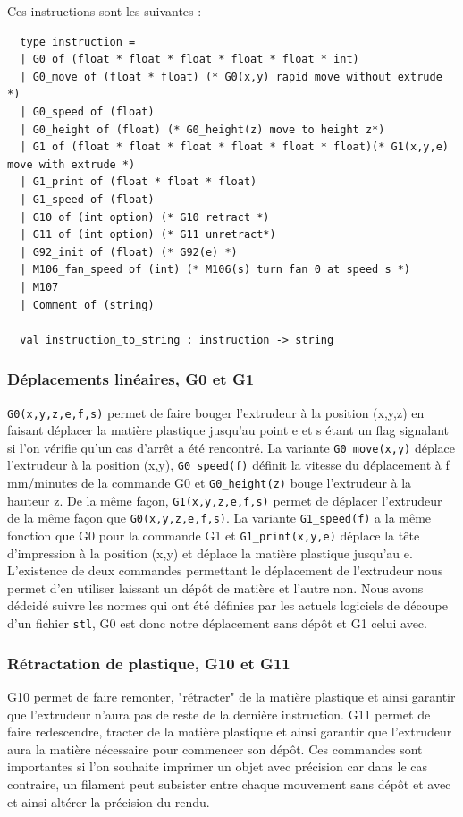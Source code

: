 \documentclass[11pt, titlepage]{article}
\begin{document}
Ces instructions sont les suivantes :
\begin{lstlisting}
  type instruction =
  | G0 of (float * float * float * float * float * int)
  | G0_move of (float * float) (* G0(x,y) rapid move without extrude *)
  | G0_speed of (float)
  | G0_height of (float) (* G0_height(z) move to height z*)
  | G1 of (float * float * float * float * float * float)(* G1(x,y,e) move with extrude *)
  | G1_print of (float * float * float)
  | G1_speed of (float)
  | G10 of (int option) (* G10 retract *)
  | G11 of (int option) (* G11 unretract*)
  | G92_init of (float) (* G92(e) *)
  | M106_fan_speed of (int) (* M106(s) turn fan 0 at speed s *)
  | M107
  | Comment of (string)
  
  val instruction_to_string : instruction -> string
\end{lstlisting}

    \subsubsection{Déplacements linéaires, G0 et G1}
	\verb&G0(x,y,z,e,f,s)& permet de faire bouger l'extrudeur à la position (x,y,z) en faisant déplacer la matière plastique jusqu'au point e et s étant un flag signalant si l'on vérifie qu'un cas d'arrêt a été rencontré. La variante \verb&G0_move(x,y)& déplace l'extrudeur à la position (x,y), \verb&G0_speed(f)& définit la vitesse du déplacement à f mm/minutes de la commande G0 et \verb&G0_height(z)& bouge l'extrudeur à la hauteur z.
De la même façon, \verb&G1(x,y,z,e,f,s)& permet de déplacer l'extrudeur de la même façon que \verb&G0(x,y,z,e,f,s)&. La variante \verb&G1_speed(f)& a la même fonction que G0 pour la commande G1 et \verb&G1_print(x,y,e)& déplace la tête d'impression à la position (x,y) et déplace la matière plastique jusqu'au e.
L'existence de deux commandes permettant le déplacement de l'extrudeur nous permet d'en utiliser laissant un dépôt de matière et l'autre non. Nous avons dédcidé suivre les normes qui ont été définies par les actuels logiciels de découpe d'un fichier \verb&stl&, G0 est donc notre déplacement sans dépôt et G1 celui avec.
	\subsubsection{Rétractation de plastique, G10 et G11}
	G10 permet de faire remonter, "rétracter" de la matière plastique et ainsi garantir que l'extrudeur n'aura pas de reste de la dernière instruction.
G11 permet de  faire redescendre, tracter de la matière plastique et ainsi garantir que l'extrudeur aura la matière nécessaire pour commencer son dépôt.
Ces commandes sont importantes si l'on souhaite imprimer un objet avec précision car dans le cas contraire, un filament peut subsister entre chaque mouvement sans dépôt et avec et ainsi altérer la précision du rendu.
\end{document}
